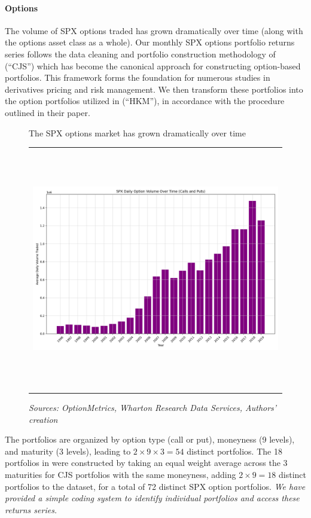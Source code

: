 \documentclass{article}
\begin{document}
\paragraph{Options} The volume of SPX options traded has grown dramatically over time (along with the options asset class as a whole). Our monthly SPX options portfolio returns series follows the data cleaning and portfolio construction methodology of \citet{Constantinides2013} (``CJS'') which has become the canonical approach for constructing option-based portfolios. This framework forms the foundation for numerous studies in derivatives pricing and risk management. We then transform these portfolios into the option portfolios utilized in \citet{He2017} (``HKM''), in accordance with the procedure outlined in their paper. 

\begin{figure}[H]
  \centering
  \caption{The SPX options market has grown dramatically over time}
  \begin{tabular}{@{}c@{}}
    \includegraphics[height=300pt,width=400pt]{../docs_src/spx_options_over_time.png}
  \end{tabular}
  \caption*{\emph{Sources: OptionMetrics, Wharton Research Data Services, Authors' creation}}
  \label{fig:spx_options_over_time}
\end{figure}


The \citet{Constantinides2013} portfolios are organized by option type (call or put), moneyness (9 levels), and maturity (3 levels), leading to $2 \times 9 \times 3 = 54$ distinct portfolios. The 18 portfolios in \citet{He2017} were constructed by taking an equal weight average across the 3 maturities for CJS portfolios with the same moneyness, adding $2 \times 9 = 18$ distinct portfolios to the dataset, for a total of 72 distinct SPX option portfolios. \emph{We have provided a simple coding system to identify individual portfolios and access these returns series.}
\end{document}

